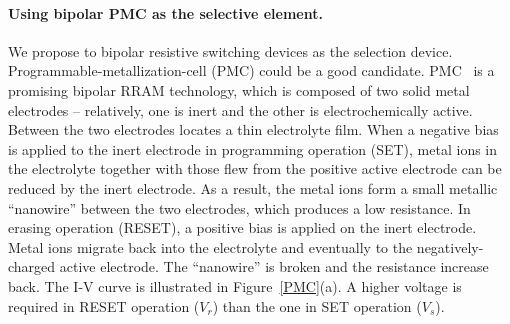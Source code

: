 \paragraph{Using bipolar PMC as the selective element.} We propose to bipolar resistive switching devices as the selection device. Programmable-metallization-cell (PMC) could be a good candidate. PMC~\cite{Kozicki05} is a promising bipolar RRAM technology, which is composed of two solid metal electrodes -- relatively, one is inert and the other is electrochemically active. Between the two electrodes locates a thin electrolyte film. When a negative bias is applied to the inert electrode in programming operation (SET), metal ions in the electrolyte together with those flew from the positive active electrode can be reduced by the inert electrode. As a result, the metal ions form a small metallic ``nanowire'' between the two electrodes, which produces a low resistance. In erasing operation (RESET), a positive bias is applied on the inert electrode. Metal ions migrate back into the electrolyte and eventually to the negatively-charged active electrode. The ``nanowire'' is broken and the resistance increase back. The I-V curve is illustrated in Figure~\ref{PMC}(a). A higher voltage is required in RESET operation ($V_r$) than the one in SET operation ($V_s$).



